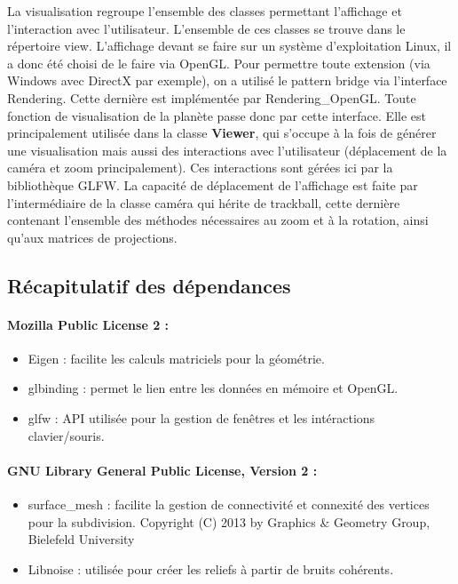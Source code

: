 \documentclass[a4paper]{article}
\begin{document}

La visualisation regroupe l'ensemble des classes permettant l'affichage et l'interaction avec l'utilisateur. L'ensemble de ces classes se trouve dans le répertoire view.
L'affichage devant se faire sur un système d'exploitation Linux, il a donc été choisi de le faire via OpenGL. Pour permettre toute extension (via Windows avec DirectX par exemple), on a utilisé le pattern bridge via l'interface Rendering. Cette dernière est implémentée par Rendering\_OpenGL. Toute fonction de visualisation de la planète passe donc par cette interface. Elle est principalement utilisée dans la classe \textbf{Viewer}, qui s'occupe à la fois de générer une visualisation mais aussi des interactions avec l'utilisateur (déplacement de la caméra et zoom principalement). Ces interactions sont gérées ici par la bibliothèque GLFW.
La capacité de déplacement de l'affichage est faite par l'intermédiaire de la classe caméra qui hérite de trackball, cette dernière contenant l'ensemble des méthodes nécessaires au zoom et à la rotation, ainsi qu'aux matrices de projections.

\subsection{Récapitulatif des dépendances}

\paragraph{Mozilla Public License 2 : }
\begin{itemize}
\item Eigen :  
     facilite les calculs matriciels pour la géométrie. 
 \item glbinding :  
     permet le lien entre les données en mémoire et OpenGL.
\item glfw : 
     API utilisée pour la gestion de fenêtres et les intéractions clavier/souris.
\end{itemize}

\paragraph{GNU Library General Public License, Version 2 : }
\begin{itemize}
\item surface\_mesh :
    facilite la gestion de connectivité et connexité des vertices pour la subdivision. Copyright (C) 2013 by Graphics \& Geometry Group, Bielefeld University
\item Libnoise :
    utilisée pour créer les reliefs à partir de bruits cohérents.
\end{itemize}
\end{document}
